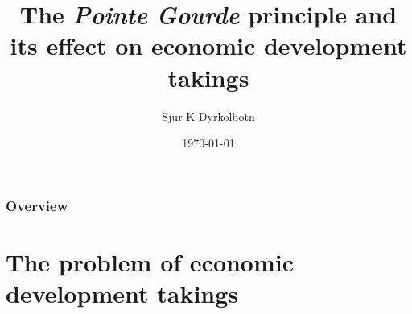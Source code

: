 \documentclass{beamer}
\title[{\it Pointe Gourde}]{The {\it Pointe Gourde} principle and its effect on economic development takings} %
\author{Sjur K Dyrkolbotn} %
\institute[Durham University] %
{
Durham University \\ %
\medskip
\textit{s.k.dyrkolbotn@durham.ac.uk} %
}
\date{\today} %
\begin{document}
\begin{frame}
\titlepage %
\end{frame}

\begin{frame}
\frametitle{Overview} %
\tableofcontents %
\end{frame}


\section{The problem of economic development takings} %

\end{document}
